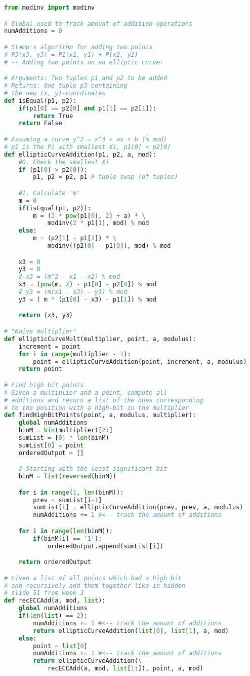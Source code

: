 \documentclass[a4paper]{article}
\begin{document}
\begin{lstlisting}[language=Python]
from modinv import modinv

# Global used to track amount of addition-operations
numAdditions = 0

# Stamp's algorithm for adding two points
# P3(x3, y3) = P1(x1, y1) + P(x2, y2)
# -- Adding two points on an elliptic curve:

# Arguments: Two tuples p1 and p2 to be added
# Returns: One tuple p3 containing
# the new (x, y)-coordinates
def isEqual(p1, p2):
	if(p1[0] == p2[0] and p1[1] == p2[1]):
		return True
	return False

# Assuming a curve y^2 = x^3 + ax + b (% mod)
# p1 is the Pi with smallest Xi, p1[0] < p2[0]
def ellipticCurveAddition(p1, p2, a, mod):
	#0. Check the smallest Xi
	if (p1[0] > p2[0]):
		p1, p2 = p2, p1 # tuple swap (of tuples)

	#1. Calculate 'm'
	m = 0
	if(isEqual(p1, p2)):
		m = (3 * pow(p1[0], 2) + a) * \
			modinv(2 * p1[1], mod) % mod
	else:
		m = (p2[1] - p1[1]) * \
			modinv((p2[0] - p1[0]), mod) % mod

	x3 = 0
	y3 = 0
	# x3 = (m^2 - x1 - x2) % mod
	x3 = (pow(m, 2) - p1[0] - p2[0]) % mod
	# y3 = (m(x1 - x3) - y1) % mod
	y3 = ( m * (p1[0] - x3) - p1[1]) % mod

	return (x3, y3)

# "Naive multiplier"
def ellipticCurveMult(multiplier, point, a, modulus):
	increment = point
	for i in range(multiplier - 1):
		point = ellipticCurveAddition(point, increment, a, modulus)
	return point

# Find high bit points
# Given a multiplier and a point, compute all
# additions and return a list of the ones corresponding
# to the position with a high-bit in the multiplier
def findHighBitPoints(point, a, modulus, multiplier):
	global numAdditions
	binM = bin(multiplier)[2:]
	sumList = [0] * len(binM)
	sumList[0] = point
	orderedOutput = []

	# Starting with the least significant bit
	binM = list(reversed(binM))

	for i in range(1, len(binM)):
		prev = sumList[i-1]
		sumList[i] = ellipticCurveAddition(prev, prev, a, modulus)
		numAdditions += 1 #<-- track the amount of additions

	for i in range(len(binM)):
		if(binM[i] == '1'):
			orderedOutput.append(sumList[i])

	return orderedOutput

# Given a list of all points which had a high bit
# and recursively add them together like in hidden
# slide 51 from week 3
def recECCAdd(a, mod, list):
	global numAdditions
	if(len(list) == 2):
		numAdditions += 1 #<-- track the amount of additions
		return ellipticCurveAddition(list[0], list[1], a, mod)
	else:
		point = list[0]
		numAdditions += 1 #<-- track the amount of additions
		return ellipticCurveAddition(\
			recECCAdd(a, mod, list[1:]), point, a, mod)


\end{lstlisting}
\end{document}
